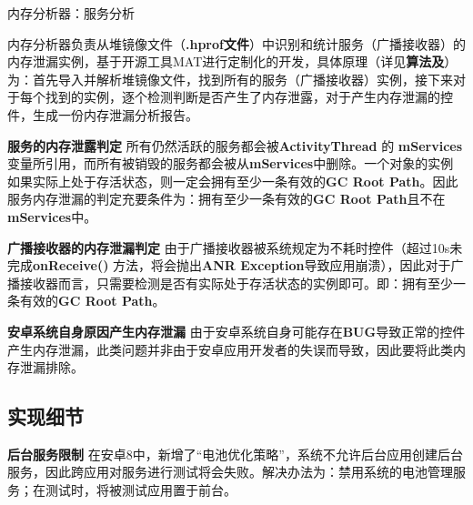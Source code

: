 \begin{algorithm}
	\caption{内存分析器：服务分析}
	\label{alg:memory analyser:receiver}
	\begin{algorithmic}[1]
					\ELSE
					\ENDIF
				\ENDIF
			\ENDIF
		\ENDFOR
	\end{algorithmic}
\end{algorithm}

内存分析器负责从堆镜像文件（\textbf{.hprof文件}）中识别和统计服务（广播接收器）的内存泄漏实例，基于开源工具MAT\cite{mat}进行定制化的开发，具体原理（详见\textbf{算法\redbf{\ref{alg:memory analyser:service}}及\redbf{\ref{alg:memory analyser:receiver}}}）为：首先导入并解析堆镜像文件，找到所有的服务（广播接收器）实例，接下来对于每个找到的实例，逐个检测判断是否产生了内存泄露，对于产生内存泄漏的控件，生成一份内存泄漏分析报告。

\textbf{服务的内存泄露判定 } 所有仍然活跃的服务都会被\textbf{ActivityThread} 的 \textbf{mServices}变量所引用，而所有被销毁的服务都会被从\textbf{mServices}中删除。一个对象的实例如果实际上处于存活状态，则一定会拥有至少一条有效的\textbf{GC Root Path}。因此服务内存泄漏的判定充要条件为：拥有至少一条有效的\textbf{GC Root Path}且不在\textbf{mServices}中。

\textbf{广播接收器的内存泄漏判定 } 由于广播接收器被系统规定为不耗时控件（超过10s未完成\textbf{onReceive()} 方法，将会抛出\textbf{ANR Exception}导致应用崩溃），因此对于广播接收器而言，只需要检测是否有实际处于存活状态的实例即可。即：拥有至少一条有效的\textbf{GC Root Path}。

\textbf{安卓系统自身原因产生内存泄漏 } 由于安卓系统自身可能存在\textbf{BUG}导致正常的控件产生内存泄漏，此类问题并非由于安卓应用开发者的失误而导致，因此要将此类内存泄漏排除。

\subsection{实现细节}

\textbf{后台服务限制 }\cite{android-service-limit} 在安卓8中，新增了“电池优化策略”，系统不允许后台应用创建后台服务，因此跨应用对服务进行测试将会失败。解决办法为：禁用系统的电池管理服务；在测试时，将被测试应用置于前台。

